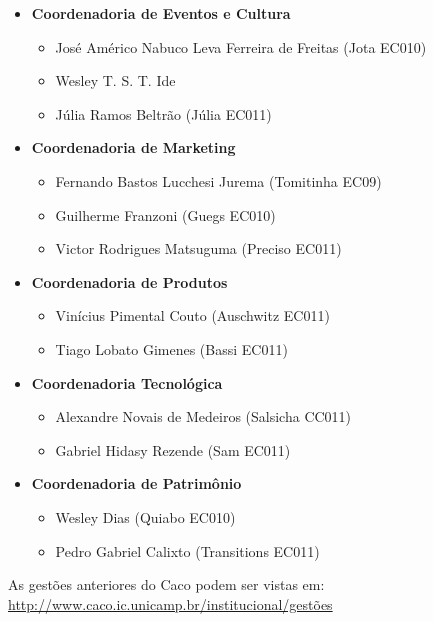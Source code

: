 \begin{itemize}
\item  \textbf{Coordenadoria de Eventos e Cultura}
\begin{itemize}
\item José Américo Nabuco Leva Ferreira de Freitas (Jota EC010)
\item Wesley T. S. T. Ide
\item Júlia Ramos Beltrão (Júlia EC011)
\end{itemize}
\end{itemize}

\begin{itemize}
\item  \textbf{Coordenadoria de Marketing}
\begin{itemize}
\item Fernando Bastos Lucchesi Jurema (Tomitinha EC09)
\item Guilherme Franzoni (Guegs EC010)
\item Victor Rodrigues Matsuguma (Preciso EC011)
\end{itemize}
\end{itemize}

\begin{itemize}
\item  \textbf{Coordenadoria de Produtos}
\begin{itemize}
\item Vinícius Pimental Couto (Auschwitz EC011)
\item Tiago Lobato Gimenes (Bassi EC011)
\end{itemize}
\end{itemize}

\begin{itemize}
\item  \textbf{Coordenadoria Tecnológica}
\begin{itemize}
\item Alexandre Novais de Medeiros (Salsicha CC011)
\item Gabriel Hidasy Rezende (Sam EC011)
\end{itemize}
\end{itemize}

\begin{itemize}
\item  \textbf{Coordenadoria de Patrimônio}
\begin{itemize}
\item Wesley Dias (Quiabo EC010)
\item Pedro Gabriel Calixto (Transitions EC011)
\end{itemize}
\end{itemize}

As gestões anteriores do Caco podem ser vistas em:
\url{http://www.caco.ic.unicamp.br/institucional/gestões}
